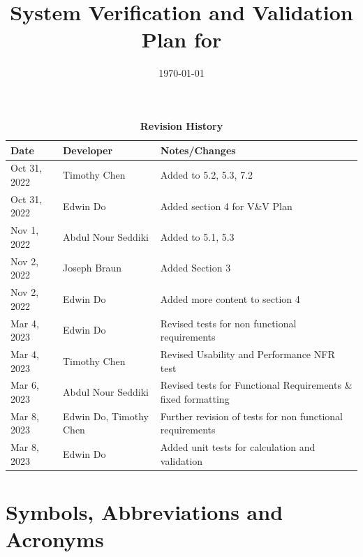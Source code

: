 \documentclass[12pt, titlepage]{article}
\begin{document}
\title{System Verification and Validation Plan for \progname{}} 
\author{\authname}
\date{\today}
	
\maketitle


\begin{table}[H]
  \caption{\bf Revision History}
  \begin{tabularx}{\textwidth}{p{2.5cm}p{2.5cm}X}
  \toprule {\bf Date} & {\bf Developer} & {\bf Notes/Changes}\\
  \midrule
  Oct 31, 2022 & Timothy Chen & Added to 5.2, 5.3, 7.2\\
  Oct 31, 2022 & Edwin Do & Added section 4 for V\&V Plan\\
  Nov 1, 2022 & Abdul Nour Seddiki & Added to 5.1, 5.3\\
  Nov 2, 2022 & Joseph Braun & Added Section 3\\
  Nov 2, 2022 & Edwin Do & Added more content to section 4 \\
  Mar 4, 2023 & Edwin Do & Revised tests for non functional requirements\\
  Mar 4, 2023 & Timothy Chen & Revised Usability and Performance NFR test\\
  Mar 6, 2023 & Abdul Nour Seddiki & Revised tests for Functional Requirements \& fixed formatting\\
  Mar 8, 2023 & Edwin Do, Timothy Chen & Further revision of tests for non functional requirements\\
  Mar 8, 2023 & Edwin Do & Added unit tests for calculation and validation\\
  \bottomrule
  \end{tabularx}
  \end{table}
  

\newpage

\tableofcontents

\listoftables


\newpage

\section{Symbols, Abbreviations and Acronyms}
\end{document}
